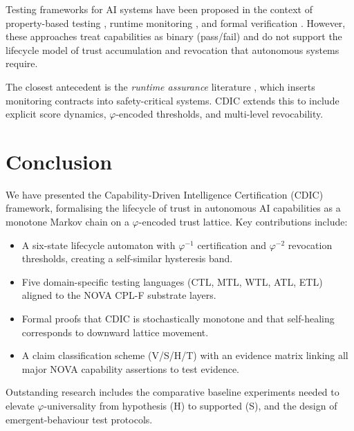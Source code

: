 \documentclass[11pt,a4paper]{article}
\begin{document}
Testing frameworks for AI systems have been proposed in the context of
property-based testing \cite{quickcheck}, runtime monitoring \cite{leucker2009brief},
and formal verification \cite{katz2017reluplex}.  However, these approaches treat
capabilities as binary (pass/fail) and do not support the lifecycle model of
trust accumulation and revocation that autonomous systems require.

The closest antecedent is the \emph{runtime assurance} literature \cite{schierman2015},
which inserts monitoring contracts into safety-critical systems.  CDIC extends this to
include explicit score dynamics, $\varphi$-encoded thresholds, and multi-level
revocability.

\section{Conclusion}
\label{sec:conclusion}

We have presented the Capability-Driven Intelligence Certification (CDIC) framework,
formalising the lifecycle of trust in autonomous AI capabilities as a monotone Markov
chain on a $\varphi$-encoded trust lattice.  Key contributions include:

\begin{itemize}
  \item A six-state lifecycle automaton with $\varphi^{-1}$ certification and
    $\varphi^{-2}$ revocation thresholds, creating a self-similar hysteresis band.
  \item Five domain-specific testing languages (CTL, MTL, WTL, ATL, ETL) aligned to
    the NOVA CPL-F substrate layers.
  \item Formal proofs that CDIC is stochastically monotone and that self-healing
    corresponds to downward lattice movement.
  \item A claim classification scheme (V/S/H/T) with an evidence matrix linking
    all major NOVA capability assertions to test evidence.
\end{itemize}

Outstanding research includes the comparative baseline experiments needed to elevate
$\varphi$-universality from hypothesis (H) to supported (S), and the design of
emergent-behaviour test protocols.
\end{document}
